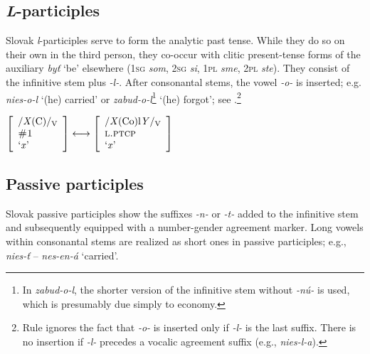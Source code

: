 \documentclass[output=paper,colorlinks,citecolor=brown]{langscibook}
\begin{document}

\subsection{\textit{L}-participles}\label{sec:LPT}

Slovak \textit{l}-participles serve to form the analytic past tense. While they do so on their own in the third person, they co-occur with clitic present-tense forms of the auxiliary \textit{byť} `be' elsewhere (\textsc{1sg} \textit{som}, \textsc{2sg} \textit{si}, \textsc{1pl} \textit{sme}, \textsc{2pl} \textit{ste}). They consist of the infinitive stem plus \textit{-l-}. After consonantal stems, the vowel \textit{-o-} is inserted; e.g. \textit{nies-o-l} `(he) carried' or \textit{zabud-o-l}\footnote{In \textit{zabud-o-l}, the shorter version of the infinitive stem without \textit{-nú-} is used, which is presumably due simply to economy.} `(he) forgot'; see .\footnote{Rule  ignores the fact that \textit{-o-} is inserted only if \textit{-l-} is the last suffix. There is no insertion if \textit{-l-} precedes a vocalic agreement suffix (e.g., \textit{nies-l-a}).}

\ea\label{ex:ruleLPT}
$\left[
\begin{array}{l}
    \text{/\textit{X}(C)/\textsubscript{V}} \\
    \textsc{\#1} \\
    \text{`\textit{x}'}
\end{array}
\right] 
\longleftrightarrow
\left[
\begin{array}{l}
    \text{/\textit{X}(Co)l\textit{Y}/\textsubscript{V}} \\
    \textsc{l.ptcp} \\
    \text{`\textit{x}'}
\end{array}
\right] $
\z


\subsection{Passive participles}\label{sec:PPP}

Slovak passive participles show the suffixes \textit{-n-} or \textit{-t-} added to the infinitive stem and subsequently equipped with a number-gender agreement marker. Long vowels within consonantal stems are realized as short ones in passive participles; e.g., \textit{nies-ť} -- \textit{nes-en-á} `carried'.
\end{document}
